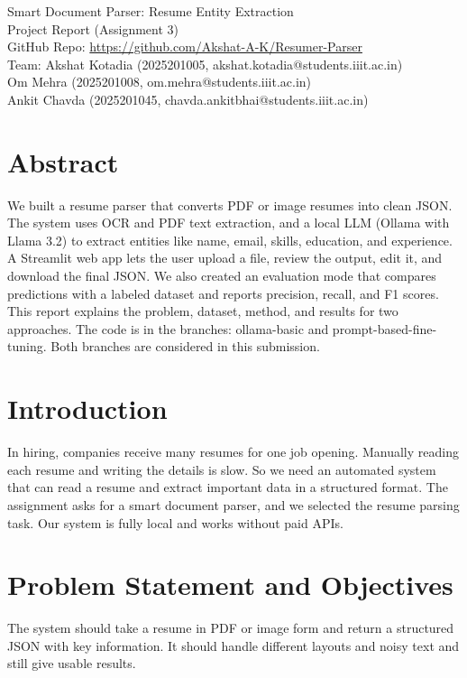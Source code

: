 \documentclass[11pt,a4paper]{article}
\begin{document}
\begin{center}
{\LARGE Smart Document Parser: Resume Entity Extraction}\\[6pt]
{\large Project Report (Assignment 3)}\\[6pt]
{\normalsize GitHub Repo: \href{https://github.com/Akshat-A-K/Resumer-Parser}{https://github.com/Akshat-A-K/Resumer-Parser}}\\[4pt]
{\normalsize Team: Akshat Kotadia (2025201005, akshat.kotadia@students.iiit.ac.in)\\
Om Mehra (2025201008, om.mehra@students.iiit.ac.in)\\
Ankit Chavda (2025201045, chavda.ankitbhai@students.iiit.ac.in)}
\end{center}

\section{Abstract}
We built a resume parser that converts PDF or image resumes into clean JSON. The system uses OCR and PDF text extraction, and a local LLM (Ollama with Llama 3.2) to extract entities like name, email, skills, education, and experience. A Streamlit web app lets the user upload a file, review the output, edit it, and download the final JSON. We also created an evaluation mode that compares predictions with a labeled dataset and reports precision, recall, and F1 scores. This report explains the problem, dataset, method, and results for two approaches. The code is in the branches: ollama-basic and prompt-based-fine-tuning. Both branches are considered in this submission.


\section{Introduction}
In hiring, companies receive many resumes for one job opening. Manually reading each resume and writing the details is slow. So we need an automated system that can read a resume and extract important data in a structured format. The assignment asks for a smart document parser, and we selected the resume parsing task. Our system is fully local and works without paid APIs.

\section{Problem Statement and Objectives}
The system should take a resume in PDF or image form and return a structured JSON with key information. It should handle different layouts and noisy text and still give usable results.
\end{document}
